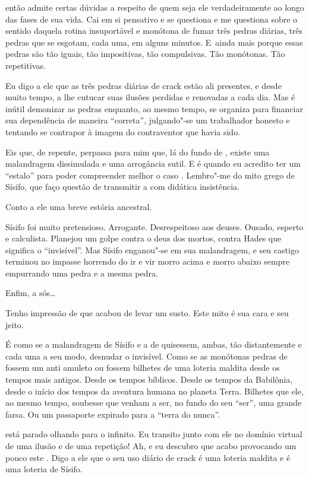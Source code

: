  então admite certas dúvidas a respeito de quem seja ele
verdadeiramente ao longo das fases de sua vida. Cai em si pensativo e se
questiona e me questiona sobre o sentido daquela rotina insuportável e
monótona de fumar três pedras diárias, três pedras que se esgotam, cada
uma, em alguns minutos. E~ainda mais porque essas pedras são tão iguais,
tão impositivas, tão compulsivas. Tão monótonas. Tão repetitivas.

Eu digo a ele que as três pedras diárias de crack estão ali presentes, e
desde muito tempo, a lhe cutucar suas ilusões perdidas e renovadas a
cada dia. Mas é inútil demonizar as pedras enquanto, ao mesmo tempo, 
se organiza para financiar sua dependência de maneira ``correta'',
julgando"-se um trabalhador honesto e tentando se contrapor à imagem do
contraventor que havia sido.

Eis que, de repente, perpassa para mim que, lá do fundo de , existe
uma malandragem dissimulada e uma arrogância sutil. E é quando eu
acredito ter um ``estalo'' para poder compreender melhor o caso .
Lembro"-me do mito grego de Sísifo, que faço questão de transmitir a 
com didática insistência.

Conto a ele uma breve estória ancestral.

Sísifo foi muito pretensioso. Arrogante. Desrespeitoso aos deuses.
Ousado, esperto e calculista. Planejou um golpe contra o deus dos
mortos, contra Hades que significa o ``invisível''. Mas Sísifo
enganou"-se em sua malandragem, e seu castigo terminou no impasse
horrendo do ir e vir morro acima e morro abaixo sempre empurrando uma
pedra e a mesma pedra.

Enfim, a sós…

Tenho impressão de que  acabou de levar um susto. Este mito é sua cara
e seu jeito.

É como se a malandragem de Sísifo e a de  quisessem, ambas, tão
distantemente e cada uma a seu modo, desnudar o invisível. Como se as
monótonas pedras de  fossem um anti amuleto ou fossem bilhetes de uma
loteria maldita desde os tempos mais antigos. Desde os tempos bíblicos.
Desde os tempos da Babilônia, desde o início dos tempos da aventura
humana no planeta Terra. Bilhetes que ele, ao mesmo tempo, soubesse que
venham a ser, no fundo do seu ``ser'', uma grande farsa. Ou um
passaporte expirado para a ``terra do nunca''.

 está parado olhando para o infinito. Eu transito junto com ele no
domínio virtual de uma ilusão e de uma repetição! Ah, e eu descubro que
acabo provocando um pouco este . Digo a ele que o seu uso diário de
crack é uma loteria maldita e é uma loteria de Sísifo.

